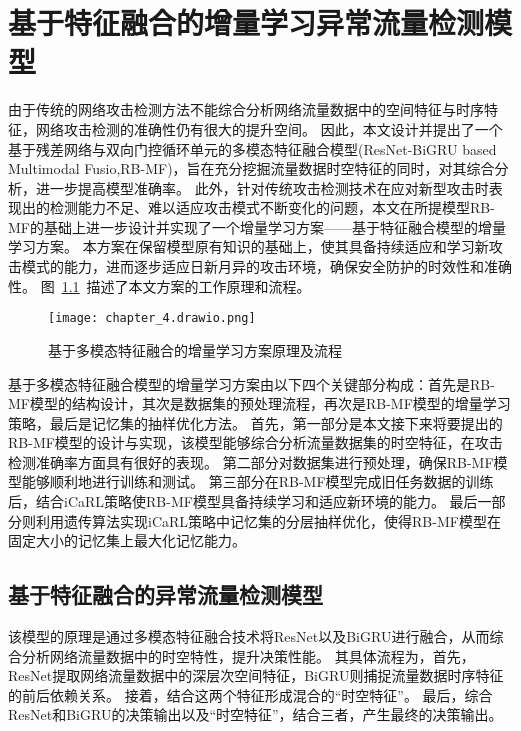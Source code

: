 \chapter{基于特征融合的增量学习异常流量检测模型}
\label{cha:ResNet-BiGRU}

由于传统的网络攻击检测方法不能综合分析网络流量数据中的空间特征与时序特征，网络攻击检测的准确性仍有很大的提升空间。
因此，本文设计并提出了一个基于残差网络与双向门控循环单元的多模态特征融合模型(ResNet-BiGRU based Multimodal Fusio,RB-MF)，旨在充分挖掘流量数据时空特征的同时，对其综合分析，进一步提高模型准确率。
此外，针对传统攻击检测技术在应对新型攻击时表现出的检测能力不足、难以适应攻击模式不断变化的问题，本文在所提模型RB-MF的基础上进一步设计并实现了一个增量学习方案——基于特征融合模型的增量学习方案。
本方案在保留模型原有知识的基础上，使其具备持续适应和学习新攻击模式的能力，进而逐步适应日新月异的攻击环境，确保安全防护的时效性和准确性。
图~\ref{fig:attack_detecion_model}~描述了本文方案的工作原理和流程。
\begin{figure}[h]
	\centering
	\texttt{[image: chapter\_4.drawio.png]}
	\caption{基于多模态特征融合的增量学习方案原理及流程}
	\label{fig:attack_detecion_model}
\end{figure}

基于多模态特征融合模型的增量学习方案由以下四个关键部分构成：首先是RB-MF模型的结构设计，其次是数据集的预处理流程，再次是RB-MF模型的增量学习策略，最后是记忆集的抽样优化方法。
首先，第一部分是本文接下来将要提出的RB-MF模型的设计与实现，该模型能够综合分析流量数据集的时空特征，在攻击检测准确率方面具有很好的表现。
第二部分对数据集进行预处理，确保RB-MF模型能够顺利地进行训练和测试。
第三部分在RB-MF模型完成旧任务数据的训练后，结合iCaRL\cite{rebuffi2017icarl}策略使RB-MF模型具备持续学习和适应新环境的能力。
最后一部分则利用遗传算法实现iCaRL策略中记忆集的分层抽样优化，使得RB-MF模型在固定大小的记忆集上最大化记忆能力。

\section{基于特征融合的异常流量检测模型}
该模型的原理是通过多模态特征融合技术将ResNet以及BiGRU进行融合，从而综合分析网络流量数据中的时空特性，提升决策性能。
其具体流程为，首先，ResNet提取网络流量数据中的深层次空间特征，BiGRU则捕捉流量数据时序特征的前后依赖关系。
接着，结合这两个特征形成混合的“时空特征”。
最后，综合ResNet和BiGRU的决策输出以及“时空特征”，结合三者，产生最终的决策输出。
